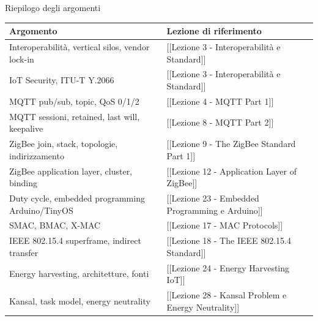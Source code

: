 \documentclass[
  italian,
  openany]{book}
\newcounter{none} %
\begin{document}
\begin{calloutnote}{Riepilogo degli argomenti}

{\def\LTcaptype{none} %
\begin{longtable}[]{@{}
  >{\raggedright\arraybackslash}p{}
  >{\raggedright\arraybackslash}p{}@{}}
\toprule\noalign{}
\begin{minipage}[b]{\linewidth}\raggedright
Argomento
\end{minipage} & \begin{minipage}[b]{\linewidth}\raggedright
Lezione di riferimento
\end{minipage} \\
\midrule\noalign{}
\endhead
\bottomrule\noalign{}
\endlastfoot
Interoperabilità, vertical silos, vendor lock-in & {[}{[}Lezione 3 -
Interoperabilità e Standard{]}{]} \\
IoT Security, ITU-T Y.2066 & {[}{[}Lezione 3 - Interoperabilità e
Standard{]}{]} \\
MQTT pub/sub, topic, QoS 0/1/2 & {[}{[}Lezione 4 - MQTT Part 1{]}{]} \\
MQTT sessioni, retained, last will, keepalive & {[}{[}Lezione 8 - MQTT
Part 2{]}{]} \\
ZigBee join, stack, topologie, indirizzamento & {[}{[}Lezione 9 - The
ZigBee Standard Part 1{]}{]} \\
ZigBee application layer, cluster, binding & {[}{[}Lezione 12 -
Application Layer of ZigBee{]}{]} \\
Duty cycle, embedded programming Arduino/TinyOS & {[}{[}Lezione 23 -
Embedded Programming e Arduino{]}{]} \\
SMAC, BMAC, X-MAC & {[}{[}Lezione 17 - MAC Protocols{]}{]} \\
IEEE 802.15.4 superframe, indirect transfer & {[}{[}Lezione 18 - The
IEEE 802.15.4 Standard{]}{]} \\
Energy harvesting, architetture, fonti & {[}{[}Lezione 24 - Energy
Harvesting IoT{]}{]} \\
Kansal, task model, energy neutrality & {[}{[}Lezione 28 - Kansal
Problem e Energy Neutrality{]}{]} \\
\end{longtable}
}

\end{calloutnote}

\newpage

\backmatter
\end{document}
